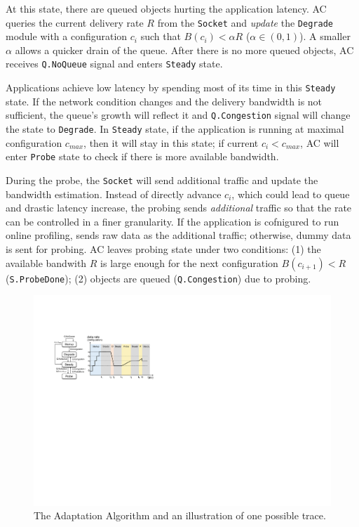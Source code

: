  At this state, there are queued objects
hurting the application latency. AC queries the current delivery rate $R$ from
the \texttt{Socket} and \textit{update} the \texttt{Degrade} module with a
configuration $c_i$ such that $B(c_i) < \alpha R$ ($\alpha \in (0, 1)$). A
smaller $\alpha$ allows a quicker drain of the queue. After there is no more
queued objects, AC receives \texttt{Q.NoQueue} signal and enters \texttt{Steady}
state.

 Applications achieve low latency
by spending most of its time in this \texttt{Steady} state. If the network
condition changes and the delivery bandwidth is not sufficient, the queue's
growth will reflect it and \texttt{Q.Congestion} signal will change the state to
\texttt{Degrade}. In \texttt{Steady} state, if the application is running at
maximal configuration $c_{max}$, then it will stay in this state; if current
$c_i < c_{max}$, AC will enter \texttt{Probe} state to check if there is more
available bandwidth.

 During the probe, the
\texttt{Socket} will send additional traffic and update the bandwidth
estimation. Instead of directly advance $c_i$, which could lead to queue and
drastic latency increase, the probing sends \textit{additional} traffic so that
the rate can be controlled in a finer granularity. If the application is
cofnigured to run online profiling, \sysname{} sends raw data as the additional
traffic; otherwise, dummy data is sent for probing. AC leaves probing state
under two conditions: (1) the available bandwith $R$ is large enough for the
next configuration $B(c_{i+1}) < R$ (\texttt{S.ProbeDone}); (2) objects are
queued (\texttt{Q.Congestion}) due to probing.

\begin{figure}
  \centering
  \includegraphics[width=\columnwidth]{figures/cc.pdf}
  \caption{The Adaptation Algorithm and an illustration of one possible trace.}
  \label{fig:cc}
  \vspace{-2em}
\end{figure}

